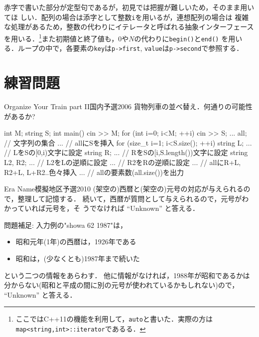 赤字で書いた部分が定型句であるが，初見では把握が難しいため，そのまま用いてほ
しい．配列の場合は添字として整数\texttt{i}を用いるが，連想配列の場合は
複雑な処理があるため，整数の代わりにイテレータと呼ばれる抽象インターフェースを用いる．\footnote{ここではC++11の機能を利用して，\texttt{auto}と書いた．実際の方は\texttt{map<string,int>::iterator}であるる．}また初期値と終了値も，$0$や$N$の代わりに\texttt{begin()}と\texttt{end()}
を用いる．ループの中で，各要素の\texttt{key}は\texttt{p->first}, \texttt{value}は\texttt{p->second}で参照する．


\section{練習問題}
\begin{pbox}{Organize Your Train part II}{国内予選2006}
貨物列車の並べ替え．何通りの可能性があるか?

\end{pbox}

\begin{cbox}
int M;
string S;
int main() {
    cin >> M;
    for (int i=0; i<M; ++i) {
        cin >> S;
        ... all; // 文字列の集合
        ... // allにSを挿入
        for (size_t i=1; i<S.size(); ++i) {
            string L;
            ... // LをSの[0,i)文字に設定
            string R;
            ... // RをSの[i,S.length())文字に設定
            string L2, R2;
            ... // L2をLの逆順に設定
            ... // R2をRの逆順に設定
            ... // allにR+L, R2+L, L+R2..色々挿入
        }
        ... // allの要素数(all.size())を出力
    }
}  
\end{cbox}

\begin{pbox}{Era Name}{模擬地区予選2010}
(架空の)西暦と(架空の)元号の対応が与えられるので，整理して記憶する．
続いて，西暦が質問として与えられるので，元号がわかっていれば元号を，そ
うでなければ ``Unknown'' と答える．

\end{pbox}

問題補足: 入力例の"showa 62 1987"は，
\begin{itemize}
\setlength{\itemsep}{0pt}
\item 昭和元年(1年)の西暦は，1926年である
\item 昭和は，(少なくとも)1987年まで続いた
\end{itemize}
という二つの情報をあらわす．
他に情報がなければ，1988年が昭和であるかは分からない(昭和と平成の間に別の元号が使われているかもしれない)ので，
 ``Unknown'' と答える．

